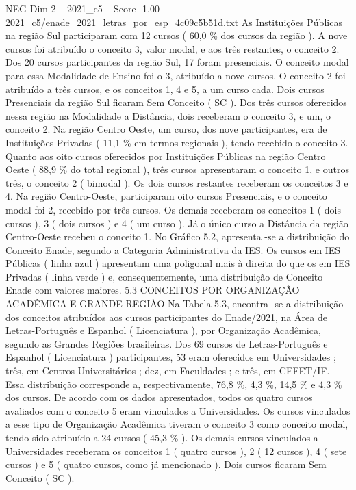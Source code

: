 \begin{textsample}{NEG Dim 2 – 2021\_c5 – Score -1.00 – 2021\_c5/enade\_2021\_letras\_por\_esp\_4c09c5b51d.txt}
As Instituições Públicas na região Sul participaram com 12 cursos ( 60,0 \% dos cursos da região ).
A nove cursos foi atribuído o conceito 3, valor modal, e aos três restantes, o conceito 2.
Dos 20 cursos participantes da região Sul, 17 foram presenciais.
O conceito modal para essa Modalidade de Ensino foi o 3, atribuído a nove cursos.
O conceito 2 foi atribuído a três cursos, e os conceitos 1, 4 e 5, a um curso cada.
Dois cursos Presenciais da região Sul ficaram Sem Conceito ( SC ).
Dos três cursos oferecidos nessa região na Modalidade a Distância, dois receberam o conceito 3, e um, o conceito 2.
Na região Centro Oeste, um curso, dos nove participantes, era de Instituições Privadas ( 11,1 \% em termos regionais ), tendo recebido o conceito 3.
Quanto aos oito cursos oferecidos por Instituições Públicas na região Centro Oeste ( 88,9 \% do total regional ), três cursos apresentaram o conceito 1, e outros três, o conceito 2 ( bimodal ).
Os dois cursos restantes receberam os conceitos 3 e 4.
Na região Centro-Oeste, participaram oito cursos Presenciais, e o conceito modal foi 2, recebido por três cursos.
Os demais receberam os conceitos 1 ( dois cursos ), 3 ( dois cursos ) e 4 ( um curso ).
Já o único curso a Distância da região Centro-Oeste recebeu o conceito 1.
No Gráfico 5.2, apresenta -se a distribuição do Conceito Enade, segundo a Categoria Administrativa da IES.
Os cursos em IES Públicas ( linha azul ) apresentam uma poligonal mais à direita do que os em IES Privadas ( linha verde ) e, consequentemente, uma distribuição de Conceito Enade com valores maiores. 5.3 CONCEITOS POR ORGANIZAÇÃO ACADÊMICA E GRANDE REGIÃO Na Tabela 5.3, encontra -se a distribuição dos conceitos atribuídos aos cursos participantes do Enade/2021, na Área de Letras-Português e Espanhol ( Licenciatura ), por Organização Acadêmica, segundo as Grandes Regiões brasileiras.
Dos 69 cursos de Letras-Português e Espanhol ( Licenciatura ) participantes, 53 eram oferecidos em Universidades ; três, em Centros Universitários ; dez, em Faculdades ; e três, em CEFET/IF.
Essa distribuição corresponde a, respectivamente, 76,8 \%, 4,3 \%, 14,5 \% e 4,3 \% dos cursos.
De acordo com os dados apresentados, todos os quatro cursos avaliados com o conceito 5 eram vinculados a Universidades.
Os cursos vinculados a esse tipo de Organização Acadêmica tiveram o conceito 3 como conceito modal, tendo sido atribuído a 24 cursos ( 45,3 \% ).
Os demais cursos vinculados a Universidades receberam os conceitos 1 ( quatro cursos ), 2 ( 12 cursos ), 4 ( sete cursos ) e 5 ( quatro cursos, como já mencionado ).
Dois cursos ficaram Sem Conceito ( SC ).

\end{textsample}
